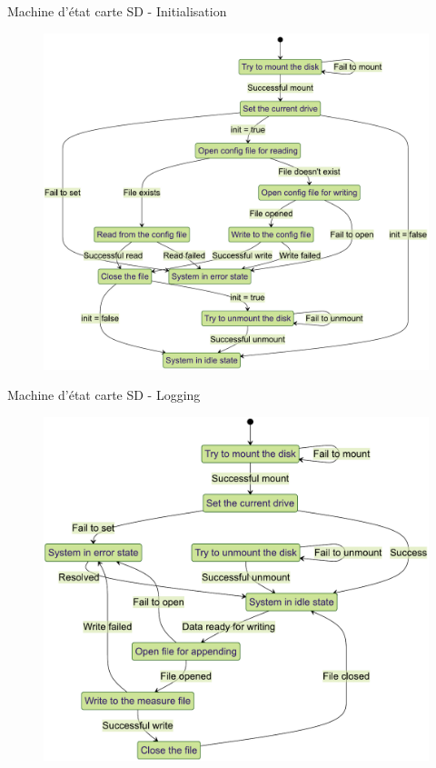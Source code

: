 \documentclass{beamer}
\begin{document}
\begin{frame}{Machine d'état carte SD - Initialisation}
	\begin{figure}[h]
		\centering
		\includegraphics[height=.9\textheight]{../figures/code/diagrammes/sd-card-Init}
		\label{fig:sd-card-init}
	\end{figure}
\end{frame}

\begin{frame}{Machine d'état carte SD - Logging}
\begin{figure}[h]
	\centering
	\includegraphics[height=.9\textheight]{../figures/code/diagrammes/sd-card-logging}
	\label{fig:sd-card-logging}
\end{figure}
\end{frame}
\end{document}

